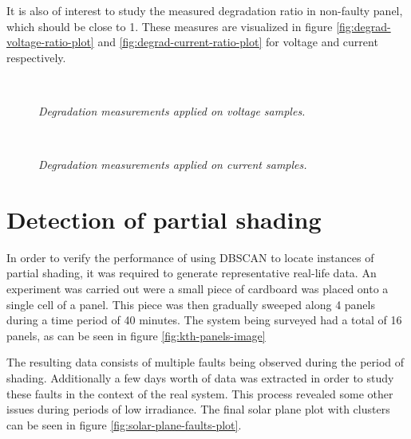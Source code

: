It is also of interest to study the measured degradation ratio in non-faulty panel, which should be close to 1.
These measures are visualized in figure \ref{fig:degrad-voltage-ratio-plot} and \ref{fig:degrad-current-ratio-plot} for voltage and current respectively.


\begin{figure}[here]
\centering
{}
~
\caption[Performance of distance-based method (voltage)]{\emph{Degradation measurements applied on voltage samples.}}
\end{figure}


\begin{figure}[here]
\centering
{}
~
\caption[Performance of distance-based method (current)]{\emph{Degradation measurements applied on current samples.}}
\end{figure}

\clearpage
\section{Detection of partial shading}
In order to verify the performance of using DBSCAN to locate instances of partial shading, it was required to generate representative real-life data.
An experiment was carried out were a small piece of cardboard was placed onto a single cell of a panel.
This piece was then gradually sweeped along 4 panels during a time period of 40 minutes.
The system being surveyed had a total of 16 panels, as can be seen in figure \ref{fig:kth-panels-image}

The resulting data consists of multiple faults being observed during the period of shading.
Additionally a few days worth of data was extracted in order to study these faults in the context of the real system.
This process revealed some other issues during periods of low irradiance.
The final solar plane plot with clusters can be seen in figure \ref{fig:solar-plane-faults-plot}.

